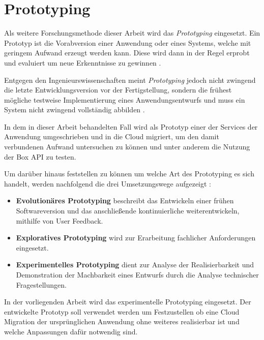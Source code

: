 \section{Prototyping}

Als weitere Forschungsmethode dieser Arbeit wird das \textit{Prototyping} eingesetzt. Ein Prototyp ist die Vorabversion einer Anwendung oder eines Systems, welche mit geringem Aufwand erzeugt werden kann. Diese wird dann in der Regel erprobt und evaluiert um neue Erkenntnisse zu gewinnen \cite[Vgl.][S. 282]{Wilde2007}\cite[Vgl.][S. 114]{Heinrich2011}.

Entgegen den Ingenieurswissenschaften meint \textit{Prototyping} jedoch nicht zwingend die letzte Entwicklungsversion vor der Fertigstellung, sondern die frühest mögliche testweise Implementierung eines Anwendungsentwurfs \cite[Vgl.][S. 114]{Heinrich2011} und muss ein System nicht zwingend vollständig abbilden \cite[Vgl.][S. 119]{Heinrich2011}.

In dem in dieser Arbeit behandelten Fall wird als Prototyp einer der Services der Anwendung umgeschrieben und in die Cloud migriert, um den damit verbundenen Aufwand untersuchen zu können und unter anderem die Nutzung der Box API zu testen.

Um darüber hinaus feststellen zu können um welche Art des Prototyping es sich handelt, werden nachfolgend die drei Umsetzungswege aufgezeigt \cite[Vgl. auch im Folgenden][S. 370]{Alpar2019}:
\begin{itemize}
    \item \textbf{Evolutionäres Prototyping} beschreibt das Entwickeln einer frühen Softwareversion und das anschließende kontinuierliche weiterentwickeln, mithilfe von User Feedback.
    \item \textbf{Exploratives Prototyping} wird zur Erarbeitung fachlicher Anforderungen eingesetzt.
    \item \textbf{Experimentelles Prototyping} dient zur Analyse der Realisierbarkeit und Demonstration der Machbarkeit eines Entwurfs durch die Analyse technischer Fragestellungen.
\end{itemize}

In der vorliegenden Arbeit wird das experimentelle Prototyping eingesetzt. Der entwickelte Prototyp soll verwendet werden um Festzustellen ob eine Cloud Migration der ursprünglichen Anwendung ohne weiteres realisierbar ist und welche Anpassungen dafür notwendig sind.